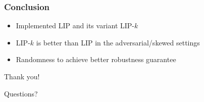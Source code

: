 \documentclass{beamer}
\begin{document}
\begin{frame}
\frametitle{Conclusion}

  \begin{itemize}
    \item Implemented LIP and its variant LIP-$k$
    \item LIP-$k$ is better than LIP in the adversarial/skewed settings
    \item Randomness to achieve better robustness guarantee
  \end{itemize}
\end{frame}


\begin{frame}
\Huge{Thank you!}
\end{frame}

\begin{frame}
\Huge{Questions?}
\end{frame}
\end{document}
